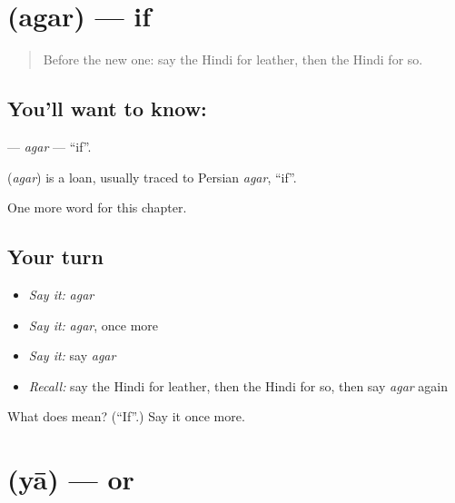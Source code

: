 \section[\texorpdfstring{\hi{अगर} (agar)}{अगर (agar)}]{ (agar) — if}

\label{lesson:HI-C247-agar}



\begin{quote}
Before the new one: say the Hindi for leather, then the Hindi for so.
\end{quote}

\subsection*{You'll want to know: }
\textbf{} — \emph{agar} — \textquotedblleft{}if\textquotedblright{}.

\begin{cousinweb}
\textbf{} (\emph{agar}) is a loan, usually traced to Persian \emph{agar}, \textquotedblleft{}if\textquotedblright{}.
\end{cousinweb}

\begin{grammarlens}[title={What you've built}]
One more word for this chapter.
\end{grammarlens}

\subsection*{Your turn}
\begin{itemize}
\raggedright
  \item \emph{Say it:} \emph{agar}
  \item \emph{Say it:} \emph{agar}, once more
  \item \emph{Say it:} say \emph{agar}
  \item \emph{Recall:} say the Hindi for leather, then the Hindi for so, then say \emph{agar} again
\end{itemize}

\begin{tcolorbox}[breakable,colback=teal!4,colframe=teal!35!black,title={Before you move on}]
What does  mean? (\textquotedblleft{}If\textquotedblright{}.) Say it once more.
\end{tcolorbox}
\section[\texorpdfstring{\hi{या} (yā)}{या (yā)}]{ (yā) — or}

